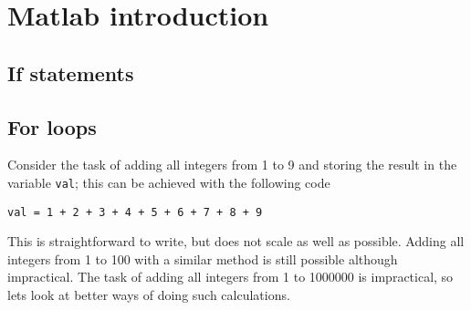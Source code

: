 \section{Matlab introduction}


\subsection{If statements}



\subsection{For loops}

Consider the task of adding all integers from 1 to 9
and storing the result in the variable \verb!val!;  
this can be achieved with the following code 
\begin{lstlisting}
val = 1 + 2 + 3 + 4 + 5 + 6 + 7 + 8 + 9
\end{lstlisting}
This is straightforward to write, but does not scale
as well as possible.
Adding all integers from 1 to 100 with a similar method
is still possible although impractical.
The task of adding all integers from 1 to 1000000 
is impractical, so lets look at better ways of doing such 
calculations.


